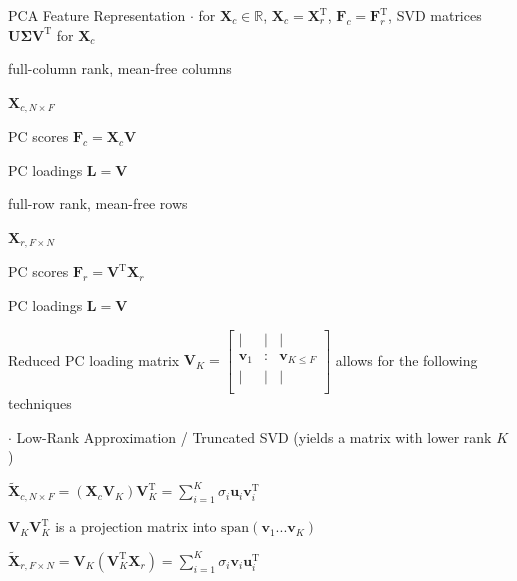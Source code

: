 \documentclass[mathserif, aspectratio=1610]{intbeamer}
\begin{document}
\begin{frame}[t]{PCA Feature Representation}
\vspace{-1.5em}
$\cdot$ for $\bm{X}_c \in\mathbb{R}$, $\bm{X}_c = \bm{X}_r^\mathrm{T}$, $\bm{F}_c = \bm{F}_r^\mathrm{T}$, SVD matrices $\bm{U} \bm{\Sigma} \bm{V}^\mathrm{T}$ for $\bm{X}_c$

\begin{minipage}[t]{0.49\textwidth}
full-column rank, mean-free columns

$\bm{X}_{c,N \times F}$

PC scores $\bm{F}_c = \bm{X}_c \bm{V}$

PC loadings $\bm{L} = \bm{V}$

\end{minipage}
%
\begin{minipage}[t]{0.49\textwidth}
full-row rank, mean-free rows

$\bm{X}_{r,F \times N}$

PC scores $\bm{F}_r = \bm{V}^\mathrm{T} \bm{X}_r$

PC loadings $\bm{L} = \bm{V}$

\end{minipage}

\vspace{1em}

Reduced PC loading matrix
$\bm{V}_K =
\begin{bmatrix}
| & | & |\\
\bm{v}_1 & : & \bm{v}_{K \leq F}\\
| & | & |\\
\end{bmatrix}
$
allows for the following techniques

\vspace{1em}

$\cdot$ Low-Rank Approximation / Truncated SVD (yields a matrix with lower rank $K$)

\begin{minipage}[t]{0.49\textwidth}

$\tilde{\bm{X}}_{c,N \times F} = (\bm{X}_c \bm{V}_K) \bm{V}_K^\mathrm{T} = \sum_{i=1}^{K} \sigma_i \bm{u}_i \bm{v}_i^\mathrm{T}$

$\bm{V}_K \bm{V}_K^\mathrm{T}$ is a projection matrix into $\text{span}(\bm{v}_1...\bm{v}_K)$
\end{minipage}
%
\begin{minipage}[t]{0.49\textwidth}

$\tilde{\bm{X}}_{r,F \times N} = \bm{V}_K (\bm{V}_K^\mathrm{T} \bm{X}_r) = \sum_{i=1}^{K} \sigma_i \bm{v}_i \bm{u}_i^\mathrm{T}$


\end{minipage}
\end{frame}
\end{document}
